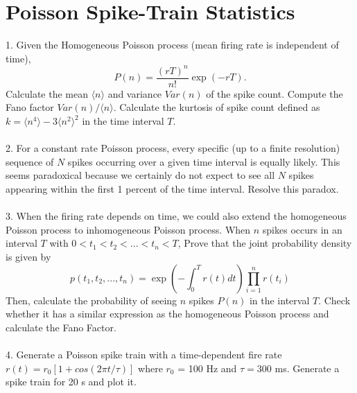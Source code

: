 \documentclass{article}
\begin{document}
\section*{Poisson Spike-Train Statistics}
1. Given the Homogeneous Poisson process (mean firing rate is independent of time), 
\begin{equation}
P(n)= \frac{(rT)^n}{n!}\exp(-rT).
\end{equation}
Calculate the mean $\langle n \rangle$ and variance $Var(n)$ of the spike count. Compute the Fano factor $Var(n)/\langle n \rangle$. 
Calculate the kurtosis of spike count defined as $k = \langle n^4 \rangle - 3 \langle n^2 \rangle^2$ in the time interval $T$. 
\\
\\
2. For a constant rate Poisson process, every specific (up to a finite resolution) sequence of $N$ spikes occurring over a given time interval is equally likely. This seems paradoxical because we certainly do not expect to see all $N$ spikes appearing within the first 1 percent of the time interval. Resolve this paradox.
\\
\\
3. When the firing rate depends on time, we could also extend the homogeneous Poisson process to inhomogeneous Poisson process. When $n$ spikes occurs in an interval $T$ with $0<t_1<t_2<...<t_n<T$,  Prove that  the joint probability density is given by 
\begin{equation}
p(t_1,t_2,...,t_n)=\exp\left(-\int_0^Tr(t)dt\right)\prod_{i=1}^{n}r(t_i)
\end{equation}
Then, calculate the probability of seeing $n$ spikes $P(n)$ in the interval $T$. Check whether it has a similar expression as the homogeneous Poisson process and calculate the Fano Factor.
\\
\\
4. Generate a Poisson spike train with a time-dependent fire rate $r(t) = r_0[1 + cos(2\pi t/\tau)]$ where $r_0$ = 100 Hz and $\tau = 300$ ms. Generate a spike train for 20 s and plot it.
\\
\\
\end{document}
